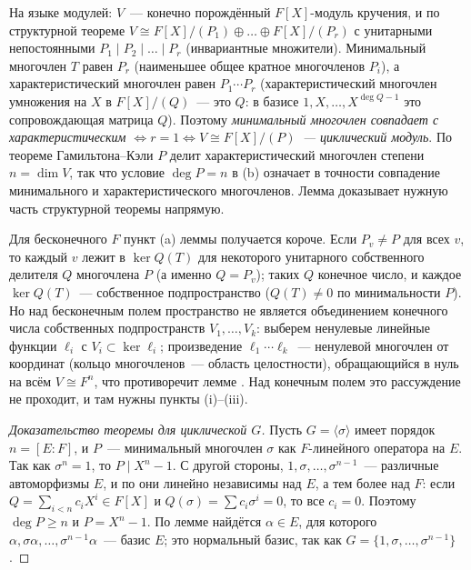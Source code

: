 \begin{remark}[5.19c]
На языке модулей: $V$~--- конечно порождённый $F[X]$-модуль кручения, и по структурной теореме
$V\cong F[X]/(P_1)\oplus\dots\oplus F[X]/(P_r)$ с унитарными непостоянными $P_1\mid P_2\mid\dots\mid P_r$ (инвариантные
множители). Минимальный многочлен $T$ равен $P_r$ (наименьшее общее кратное многочленов $P_i$), а характеристический
многочлен равен $P_1\cdots P_r$ (характеристический многочлен умножения на $X$ в $F[X]/(Q)$~--- это $Q$: в базисе
$1,X,\dots,X^{\deg Q-1}$ это сопровождающая матрица $Q$). Поэтому \emph{минимальный многочлен совпадает с
характеристическим $\iff r=1\iff V\cong F[X]/(P)$~--- циклический модуль}. По теореме Гамильтона--Кэли $P$ делит
характеристический многочлен степени $n=\dim V$, так что условие $\deg P=n$ в (b) означает в точности совпадение
минимального и характеристического многочленов. Лемма  доказывает нужную часть структурной теоремы напрямую.

Для бесконечного $F$ пункт (a) леммы  получается короче. Если $P_v\ne P$ для всех $v$, то каждый $v$ лежит в
$\ker Q(T)$ для некоторого унитарного собственного делителя $Q$ многочлена $P$ (а именно $Q=P_v$); таких $Q$ конечное
число, и каждое $\ker Q(T)$~--- собственное подпространство ($Q(T)\ne0$ по минимальности $P$). Но над бесконечным полем
пространство не является объединением конечного числа собственных подпространств $V_1,\dots,V_k$: выберем ненулевые
линейные функции $\ell_i$ с $V_i\subset\ker\ell_i$; произведение $\ell_1\cdots\ell_k$~--- ненулевой многочлен от
координат (кольцо многочленов~--- область целостности), обращающийся в нуль на всём $V\cong F^n$, что противоречит лемме
. Над конечным полем это рассуждение не проходит, и там нужны пункты (i)--(iii).
\end{remark}

\begin{proof}[Доказательство теоремы  для циклической $G$]
Пусть $G=\langle\sigma\rangle$ имеет порядок $n=[E:F]$, и $P$~--- минимальный многочлен $\sigma$ как $F$-линейного
оператора на $E$. Так как $\sigma^n=1$, то $P\mid X^n-1$. С другой стороны, $1,\sigma,\dots,\sigma^{n-1}$~--- различные
автоморфизмы $E$, и по  они линейно независимы над $E$, а тем более над $F$: если $Q=\sum_{i<n}c_iX^i\in F[X]$ и
$Q(\sigma)=\sum c_i\sigma^i=0$, то все $c_i=0$. Поэтому $\deg P\ge n$ и $P=X^n-1$. По лемме  найдётся
$\alpha\in E$, для которого $\alpha,\sigma\alpha,\dots,\sigma^{n-1}\alpha$~--- базис $E$; это нормальный базис, так как
$G=\{1,\sigma,\dots,\sigma^{n-1}\}$.
\end{proof}

